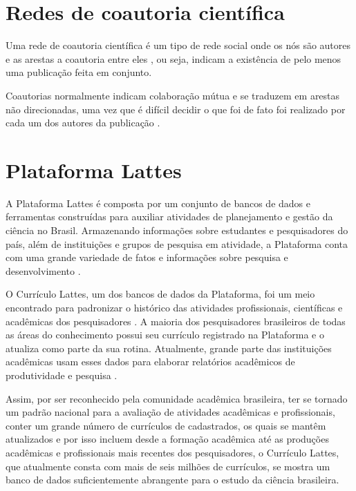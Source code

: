 \section{Redes de coautoria científica}

Uma rede de coautoria científica é um tipo de rede social onde os nós são autores e as arestas a coautoria entre eles \cite{delgado2014analyzing, franceschet2011collaboration}, ou seja, indicam a existência de pelo menos uma publicação feita em conjunto.

Coautorias normalmente indicam colaboração mútua \cite{glanzel2003bibliometrics} e se traduzem em arestas não direcionadas, uma vez que é difícil decidir o que foi de fato foi realizado por cada um dos autores da publicação \cite{ioannidis2008measuring}.

\section{Plataforma Lattes}

A Plataforma Lattes é composta por um conjunto de bancos de dados e ferramentas construídas para auxiliar atividades de planejamento e gestão da ciência no Brasil. Armazenando informações sobre estudantes e pesquisadores do país, além de instituições e grupos de pesquisa em atividade, a Plataforma conta com uma grande variedade de fatos e informações sobre pesquisa e desenvolvimento \cite{alves2011sucupira, medeiros2013dynamics}.

O Currículo Lattes, um dos bancos de dados da Plataforma, foi um meio encontrado para padronizar o histórico das atividades profissionais, científicas e acadêmicas dos pesquisadores \cite{dias2013modelagem}. A maioria dos pesquisadores brasileiros de todas as áreas do conhecimento possui seu currículo registrado na Plataforma \cite{mena2014brazilian} e o atualiza como parte da sua rotina. Atualmente, grande parte das instituições acadêmicas usam esses dados para elaborar relatórios acadêmicos de produtividade e pesquisa \cite{mena2009scriptlattes}.

Assim, por ser reconhecido pela comunidade acadêmica brasileira, ter se tornado um padrão nacional para a avaliação de atividades acadêmicas e profissionais, conter um grande número de currículos de cadastrados, os quais se mantêm atualizados e por isso incluem desde a formação acadêmica até as produções acadêmicas e profissionais mais recentes dos pesquisadores, o Currículo Lattes, que atualmente consta com mais de seis milhões de currículos, se mostra um banco de dados suficientemente abrangente para o estudo da ciência brasileira.

